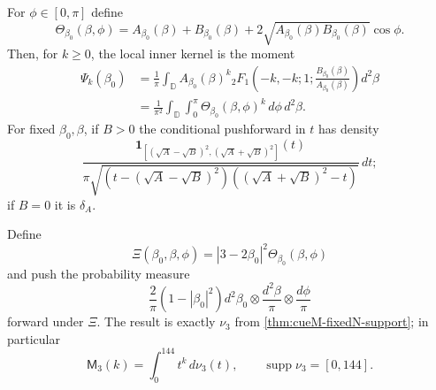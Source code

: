 \begin{theorem}
\label{thm:cueM-U3-compact-measures}
For $\phi\in[0,\pi]$ define
\begin{equation}
 \Theta_{\beta_0}(\beta,\phi)=
 A_{\beta_0}(\beta)+B_{\beta_0}(\beta)
 +2\sqrt{A_{\beta_0}(\beta)B_{\beta_0}(\beta)}\cos\phi.
 \label{eq:cueM-U3-Theta}
\end{equation}
Then, for $k\geq0$, the local inner kernel is the moment
\begin{align}
 \Psi_k(\beta_0)
 &=\frac1\pi\int_{\mathbb D}
 A_{\beta_0}(\beta)^k
 {}_2F_1\!\left(-k,-k;1;\frac{B_{\beta_0}(\beta)}
 {A_{\beta_0}(\beta)}\right)d^2\beta
 \label{eq:cueM-U3-Psi-hypergeometric}\\
 &=\frac1{\pi^2}\int_{\mathbb D}\int_0^\pi
 \Theta_{\beta_0}(\beta,\phi)^k\,d\phi\,d^2\beta.
 \label{eq:cueM-U3-Psi-measure}
\end{align}
For fixed $\beta_0,\beta$, if $B>0$ the conditional pushforward in $t$ has density
\begin{equation}
 \frac{
 \mathbf1_{[(\sqrt A-\sqrt B)^2,(\sqrt A+\sqrt B)^2]}(t)
 }{\pi\sqrt{(t-(\sqrt A-\sqrt B)^2)
 ((\sqrt A+\sqrt B)^2-t)}}\,dt;
 \label{eq:cueM-U3-conditional-density}
\end{equation}
if $B=0$ it is $\delta_A$.

Define
\begin{equation}
 \Xi(\beta_0,\beta,\phi)=|3-2\beta_0|^2
 \Theta_{\beta_0}(\beta,\phi)
 \label{eq:cueM-U3-Xi}
\end{equation}
and push the probability measure
\begin{equation}
 \frac2\pi(1-|\beta_0|^2)d^2\beta_0\otimes
 \frac{d^2\beta}{\pi}\otimes\frac{d\phi}{\pi}
 \label{eq:cueM-U3-product-measure}
\end{equation}
forward under $\Xi$.  The result is exactly $\nu_3$ from
\cref{thm:cueM-fixedN-support}; in particular
\begin{equation}
 \mathsf M_3(k)=\int_0^{144}t^k\,d\nu_3(t),\qquad
 \operatorname{supp}\nu_3=[0,144].
 \label{eq:cueM-U3-full-measure}
\end{equation}
\end{theorem}

